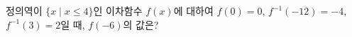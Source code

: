 정의역이 $\{x \mid x\le 4\}$인 이차함수 $f(x)$에 대하여 $f(0)=0$, $f^{-1}(-12)=-4$, $f^{-1}(3)=2$일 때, $f(-6)$의 값은?
